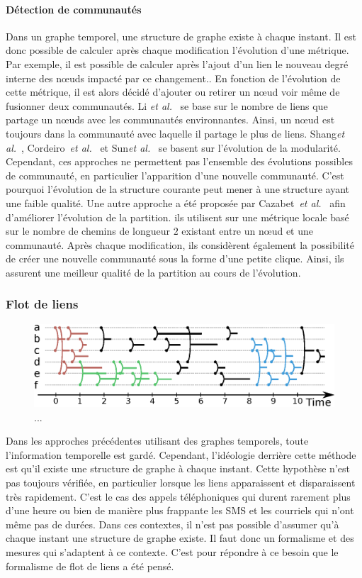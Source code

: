 \paragraph{Détection de communautés}
Dans un graphe temporel, une structure de graphe existe à chaque instant.
Il est donc possible de calculer après chaque modification l'évolution d'une métrique.
Par exemple, il est possible de calculer après l'ajout d'un lien le nouveau degré interne des n\oe uds impacté par ce changement..
En fonction de l'évolution de cette métrique, il est alors décidé d'ajouter ou retirer un n\oe ud voir même de fusionner deux communautés.
Li \emph{et al.}~\cite{Li2012a} se base sur le nombre de liens que partage un n\oe uds avec les communautés environnantes.
Ainsi, un n\oe ud est toujours dans la communauté avec laquelle il partage le plus de liens.
Shang\emph{et al.}~\cite{Shang2014a}, Cordeiro~\emph{et al.}~\cite{Cordeiro2016} et Sun\emph{et al.}~\cite{Sun2014} se basent sur l'évolution de la modularité.
Cependant, ces approches ne permettent pas l'ensemble des évolutions possibles de communauté, en particulier l'apparition d'une nouvelle communauté.
C'est pourquoi l'évolution de la structure courante peut mener à une structure ayant une faible qualité.
Une autre approche a été proposée par Cazabet~\emph{et al.}~\cite{Cazabet2010} afin d'améliorer l'évolution de la partition.
ils utilisent sur une métrique locale basé sur le nombre de chemins de longueur $2$ existant entre un n\oe ud et une communauté.
Après chaque modification, ils considèrent également la possibilité de créer une nouvelle communauté sous la forme d'une petite clique.
Ainsi, ils assurent une meilleur qualité de la partition au cours de l'évolution.


\subsubsection{Flot de liens}
\begin{figure}[h]
\centering
\includegraphics[width=0.9\linewidth]{img/Intro/Flot_de_liens.eps}
\caption{...}
\label{fig:exemple_Flot_de_liens}
\end{figure}
Dans les approches précédentes utilisant des graphes temporels, toute l'information temporelle est gardé.
Cependant, l'idéologie derrière cette méthode est qu'il existe une structure de graphe à chaque instant.
Cette hypothèse n'est pas toujours vérifiée, en particulier lorsque les liens apparaissent et disparaissent très rapidement.
C'est le cas des appels téléphoniques qui durent rarement plus d'une heure ou bien de manière plus frappante les SMS et les courriels qui n'ont même pas de durées.
Dans ces contextes, il n'est pas possible d'assumer qu'à chaque instant une structure de graphe existe.
Il faut donc un formalisme et des mesures qui s'adaptent à ce contexte.
C'est pour répondre à ce besoin que le formalisme de flot de liens a été pensé.


